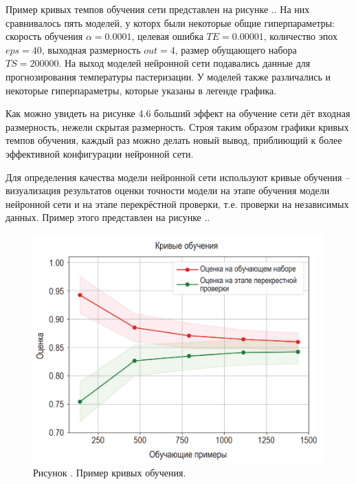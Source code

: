 {  \par \redline Пример кривых темпов обучения сети представлен на рисунке \thechaptercntr .\theimagecntr. На них сравнивалось пять моделей, у которх были некоторые общие гиперпараметры: скорость обучения $\alpha = 0.0001$, целевая ошибка $TE = 0.00001$, количество эпох $eps = 40$, выходная размерность $out = 4$, размер обущающего набора $TS = 200000$. На выход моделей нейронной сети подавались данные для прогнозирования температуры пастеризации. У моделей также различались и некоторые гиперпараметры, которые указаны в легенде графика.

  \par \redline Как можно увидеть на рисунке 4.6 больший эффект на обучение сети дёт входная размерность, нежели скрытая размерность. Строя таким образом графики кривых темпов обучения, каждый раз можно делать новый вывод, приблиющий к более эффективной конфигурации нейронной сети. 

  \par \redline Для определения качества модели нейронной сети используют кривые обучения {--} визуализация результатов оценки точности модели на этапе обучения модели нейронной сети и на этапе перекрёстной проверки, т.е. проверки на независимых данных. Пример этого представлен на рисунке \thechaptercntr .\theimagecntr.

  \begin{figure}[H]
    \centering
    \def\svgwidth{\textwidth}
    \includegraphics[scale=0.5]{images/CL.png}
    \caption*{\gostFont Рисунок \thechaptercntr .\theimagecntr \spc {--} Пример кривых обучения.}
    \label{fig:CL}
  \end{figure} \addtocounter{imagecntr}{1}

}
